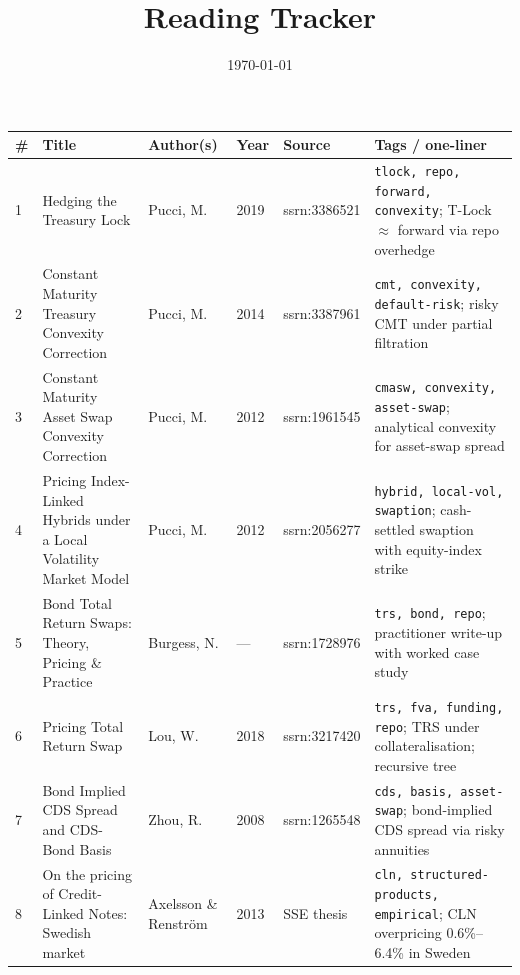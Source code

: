 \documentclass[11pt,a4paper]{article}
\title{Reading Tracker}
\author{}
\date{\today}
\begin{document}
\maketitle\vspace{-2em}

\begin{landscape}
\noindent\small
\begin{tabular}{@{}p{0.5cm}p{5cm}p{3cm}p{0.8cm}p{2cm}p{11.5cm}@{}}
\toprule
\#  & Title                                                                & Author(s)               & Year  & Source            & Tags / one-liner \\
\midrule
1   & Hedging the Treasury Lock                                            & Pucci, M.               & 2019  & ssrn:3386521      & \texttt{tlock, repo, forward, convexity}; T-Lock $\approx$ forward via repo overhedge \\
2   & Constant Maturity Treasury Convexity Correction                      & Pucci, M.               & 2014  & ssrn:3387961      & \texttt{cmt, convexity, default-risk}; risky CMT under partial filtration \\
3   & Constant Maturity Asset Swap Convexity Correction                    & Pucci, M.               & 2012  & ssrn:1961545      & \texttt{cmasw, convexity, asset-swap}; analytical convexity for asset-swap spread \\
4   & Pricing Index-Linked Hybrids under a Local Volatility Market Model   & Pucci, M.               & 2012  & ssrn:2056277      & \texttt{hybrid, local-vol, swaption}; cash-settled swaption with equity-index strike \\
5   & Bond Total Return Swaps: Theory, Pricing \& Practice                 & Burgess, N.             & ---   & ssrn:1728976      & \texttt{trs, bond, repo}; practitioner write-up with worked case study \\
6   & Pricing Total Return Swap                                            & Lou, W.                 & 2018  & ssrn:3217420      & \texttt{trs, fva, funding, repo}; TRS under collateralisation; recursive tree \\
7   & Bond Implied CDS Spread and CDS-Bond Basis                           & Zhou, R.                & 2008  & ssrn:1265548      & \texttt{cds, basis, asset-swap}; bond-implied CDS spread via risky annuities \\
8   & On the pricing of Credit-Linked Notes: Swedish market                & Axelsson \& Renström    & 2013  & SSE thesis        & \texttt{cln, structured-products, empirical}; CLN overpricing 0.6\%--6.4\% in Sweden \\

\end{tabular}
\end{landscape}
\end{document}
